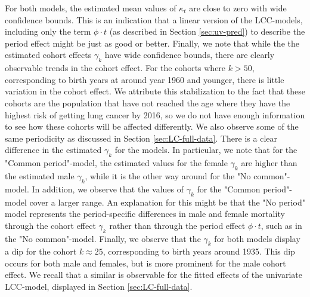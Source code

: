 \newpar For both models, the estimated mean values of $\kappa_t$ are close to zero with wide confidence bounds. This is an indication that a linear version of the LCC-models, including only the term $\phi \cdot t$ (as described in Section \ref{sec:uv-pred}) to describe the period effect might be just as good or better. Finally, we note that while the the estimated cohort effects $\gamma_k$ have wide confidence bounds, there are clearly observable trends in the cohort effect. For the cohorts where $k > 50$, corresponding to birth years at around year 1960 and younger, there is little variation in the cohort effect. We attribute this stabilization to the fact that these cohorts are the population that have not reached the age where they have the highest risk of getting lung cancer by 2016, so we do not have enough information to see how these cohorts will be affected differently. We also observe some of the same periodicity as discussed in Section \ref{sec:LC-full-data}. There is a clear difference in the estimated $\gamma_k$ for the models. In particular, we note that for the "Common period"-model, the estimated values for the female $\gamma_k$ are higher than the estimated male $\gamma_k$, while it is the other way around for the "No common"-model. In addition, we observe that the values of $\gamma_k$ for the "Common period"-model cover a larger range. An explanation for this might be that the "No period" model represents the period-specific differences in male and female mortality through the cohort effect $\gamma_k$ rather than through the period effect $\phi \cdot t$, such as in the "No common"-model. Finally, we observe that the $\gamma_k$ for both models display a dip for the cohort $k \approx 25$, corresponding to birth years around 1935. This dip occurs for both male and females, but is more prominent for the male cohort effect. We recall that a similar is observable for the fitted effects of the univariate LCC-model, displayed in Section \ref{sec:LC-full-data}. 

